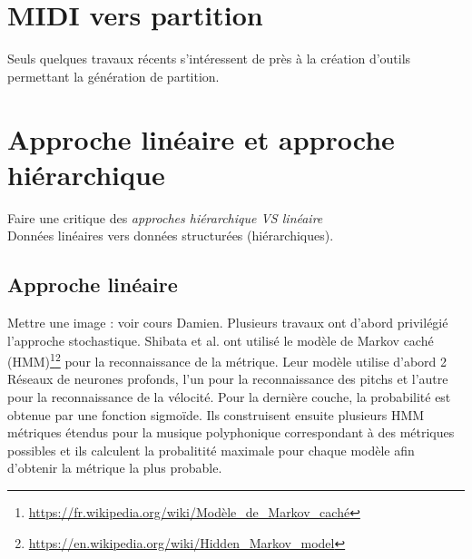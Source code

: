 \section{MIDI vers partition}
Seuls quelques travaux récents \cite{foscarin:hal-01988990} s’intéressent de près à la création d’outils permettant la génération de partition.
\section{Approche linéaire et approche hiérarchique}
Faire une critique des \textit{approches hiérarchique VS linéaire}\\
Données linéaires vers données structurées (hiérarchiques).
\subsection{Approche linéaire}
Mettre une image : voir cours Damien.
Plusieurs travaux ont d’abord privilégié l’approche stochastique. Shibata et al.\cite{SHIBATA2021262} ont utilisé le modèle de Markov caché (HMM)\footnote{\url{https://fr.wikipedia.org/wiki/Modèle_de_Markov_caché}}\footnote{\url{https://en.wikipedia.org/wiki/Hidden_Markov_model}} pour la reconnaissance de la métrique. Leur modèle utilise d’abord 2 Réseaux de neurones profonds, l’un pour la reconnaissance des pitchs et l’autre pour la reconnaissance de la vélocité. Pour la dernière couche, la probabilité est obtenue par une fonction sigmoïde. Ils construisent ensuite plusieurs HMM métriques étendus pour la musique polyphonique correspondant à des métriques possibles et ils calculent la probalitité maximale pour chaque modèle afin d’obtenir la métrique la plus probable.\\
